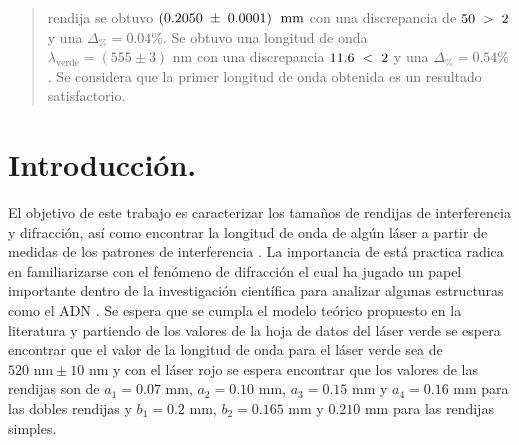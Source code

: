 \documentclass[DIV=calc, paper=a4, fontsize=10.5pt]{scrartcl}
\begin{document}
\begin{abstract}
rendija se obtuvo $(0.2050\hspace{0.1cm}\pm\hspace{0.1cm}0.0001)\hspace{0.1cm}\text{ mm }$con una discrepancia de $50\hspace{0.1cm}>\hspace{0.1cm}2$ y una  $\Delta_{\%}=0.04\%$. Se obtuvo una longitud de onda     $\lambda_{\text{verde}} = (555 \pm 3) \text{ nm}$ con una discrepancia $11.6\hspace{0.1cm}<\hspace{0.1cm}2$ y una $\Delta_{\%}=0.54\%$. Se considera que la primer longitud de onda obtenida es un resultado satisfactorio.
\end{abstract}
\section*{\textcolor{carmine}{Introducción.}}
El objetivo de este trabajo es caracterizar los tamaños de rendijas de  interferencia y difracción, así como encontrar la longitud de onda de algún láser a partir de medidas de los patrones de interferencia \cite{Manual}. La importancia de está practica radica en familiarizarse con el fenómeno de difracción el cual ha jugado un papel importante dentro de la investigación científica para analizar algunas estructuras como el ADN \cite{Manual}. Se espera que se cumpla el modelo teórico propuesto en la literatura \cite{book} y partiendo de los valores de la hoja de datos del láser verde se espera encontrar que el valor de la longitud de onda para el láser verde sea de $520\text{ nm}\pm10\text{ nm}$ y con el láser rojo se espera encontrar que los valores de las rendijas son de $a_1 = 0.07 \text{ mm}$, $a_2= 0.10 \text{ mm}$, $a_3 = 0.15 \text{ mm}$ y $a_4 = 0.16 \text{ mm}$ para las dobles rendijas y $b_1 = 0.2 \text{ mm}$, $b_2 = 0.165 \text{ mm}$ y $0.210 \text{ mm}$ para las rendijas simples.
\end{document}
